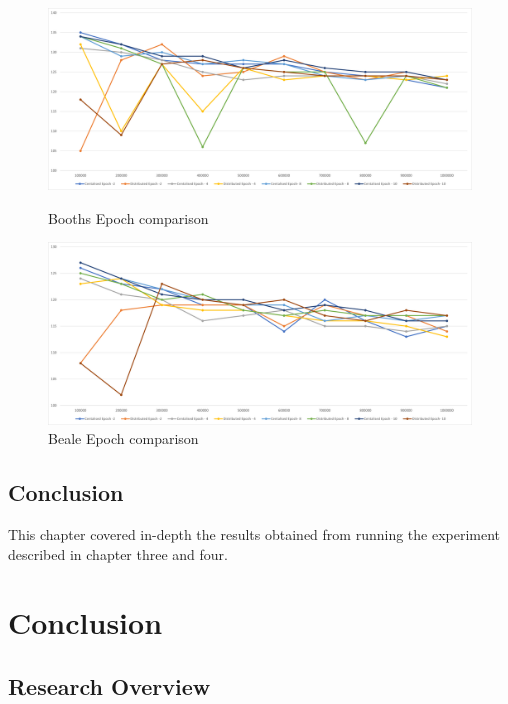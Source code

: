 \documentclass[oneside,12pt]{book}
\begin{document}
\begin{figure}[H]
  \centering
  \begin{minipage}[b]{0.48\textwidth}
    \includegraphics[width=\textwidth]{Images/Graphs/PerformanceComparisonBoothsEpoch.png}
    \caption{Booths Epoch comparison}
    \label{fig:PerformanceComparisonBoothsEpoch}
  \end{minipage}
  \hfill
  \begin{minipage}[b]{0.48\textwidth}
    \includegraphics[width=\textwidth]{Images/Graphs/PerformanceComparisonBealeEpoch.png}
    \caption{Beale Epoch comparison}
    \label{fig:PerformanceComparisonBealeEpoch}
  \end{minipage}
\end{figure}

\section{Conclusion}
This chapter covered in-depth the results obtained from running the experiment described in chapter three and four. 




\chapter{Conclusion}
\section{Research Overview}
\end{document}
